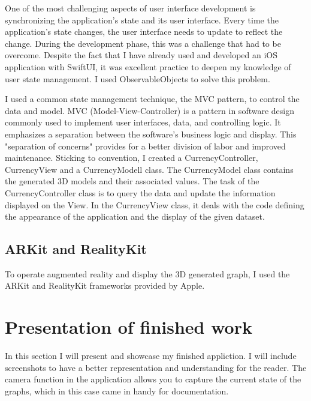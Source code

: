 \documentclass{report}
\begin{document}
One of the most challenging aspects of user interface development is synchronizing the application's state and its user interface. Every time the application's state changes, the user interface needs to update to reflect the change. During the development phase, this was a challenge that had to be overcome. Despite the fact that I have already used and developed an iOS application with SwiftUI, it was excellent practice to deepen my knowledge of user state management. I used ObservableObjects to solve this problem.

I used a common state management technique, the MVC pattern, to control the data and model. MVC (Model-View-Controller) is a pattern in software design commonly used to implement user interfaces, data, and controlling logic. It emphasizes a separation between the software's business logic and display. This "separation of concerns" provides for a better division of labor and improved maintenance. Sticking to convention, I created a CurrencyController, CurrencyView and a CurrencyModell class. The CurrencyModel class contains the generated 3D models and their associated values. The task of the CurrencyController class is to query the data and update the information displayed on the View. In the CurrencyView class, it deals with the code defining the appearance of the application and the display of the given dataset.


\section{ARKit and RealityKit}

To operate augmented reality and display the 3D generated graph, I used the ARKit and RealityKit frameworks provided by Apple.

\chapter{Presentation of finished work}

In this section I will present and showcase my finished appliction. I will include screenshots to have a better representation and understanding for the reader.
The camera function in the application allows you to capture the current state of the graphs, which in this case came in handy for documentation.
\end{document}
